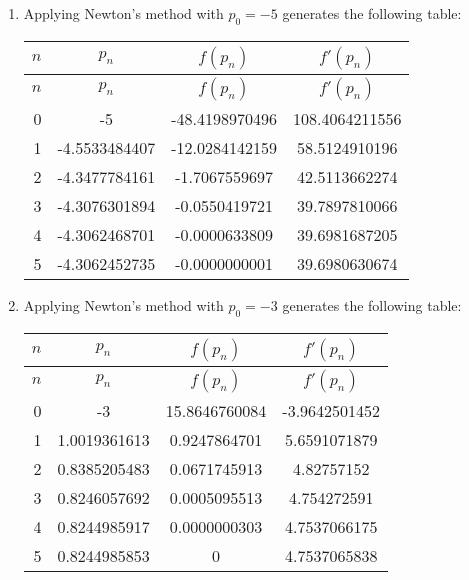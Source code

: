 \documentclass[../../../../Assignments]{subfiles}
\begin{document}
\begin{solution}
\begin{enumerate}[label = \alph*)]
        \item Applying Newton's method with \(p_0 = -5\) generates the following
            table:

            \begin{longtable}{r S[table-format=-1.10] S[table-format=-2.10] S[table-format=3.10]}
                \toprule
                \(n\)  &     {\(p_n\)}    &    {\(f(p_n)\)}   &   {\(f'(p_n)\)}  \\
                \midrule
                \endfirsthead
                \(n\)  &     {\(p_n\)}    &    {\(f(p_n)\)}   &   {\(f'(p_n)\)}  \\
                \midrule
                  &  -5             &  -48.4198970496  &  108.4064211556  \\
                    1  &  -4.5533484407  &  -12.0284142159  &   58.5124910196  \\
                    2  &  -4.3477784161  &   -1.7067559697  &   42.5113662274  \\
                    3  &  -4.3076301894  &   -0.0550419721  &   39.7897810066  \\
                    4  &  -4.3062468701  &   -0.0000633809  &   39.6981687205  \\
                    5  &  -4.3062452735  &   -0.0000000001  &   39.6980630674  \\
                \bottomrule
            \end{longtable}

        \item Applying Newton's method with \(p_0 = -3\) generates the following
            table:

            \begin{longtable}{r S[table-format=-1.10] S[table-format=2.10] S[table-format=-1.10]}
                \toprule
                \(n\)  &    {\(p_n\)}    &   {\(f(p_n)\)}  &  {\(f'(p_n)\)}  \\
                \midrule
                \endfirsthead
                \(n\)  &    {\(p_n\)}    &   {\(f(p_n)\)}  &  {\(f'(p_n)\)}  \\
                \midrule
                  &  -3             &  15.8646760084  &  -3.9642501452  \\
                    1  &   1.0019361613  &   0.9247864701  &   5.6591071879  \\
                    2  &   0.8385205483  &   0.0671745913  &   4.82757152    \\
                    3  &   0.8246057692  &   0.0005095513  &   4.754272591   \\
                    4  &   0.8244985917  &   0.0000000303  &   4.7537066175  \\
                    5  &   0.8244985853  &   0             &   4.7537065838  \\
                \bottomrule
            \end{longtable}


\end{enumerate}
\end{solution}
\end{document}
